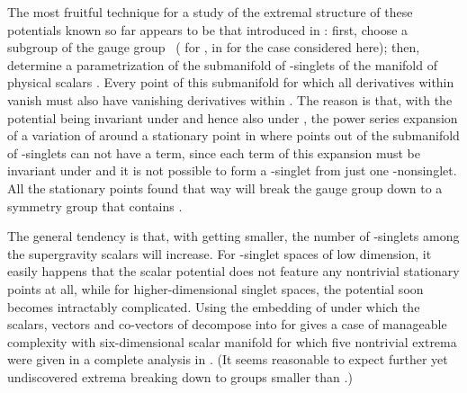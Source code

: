 \documentclass[a4paper,12pt]{article}
\begin{document}
The most fruitful technique for a study of the extremal structure of
these potentials known so far appears to be that introduced in
\cite{Warner:vz}: first, choose a subgroup \coordHE{} of the gauge group~\coordHE{}
(\coordHE{} for \coordHE{}, 
\coordHE{} in for the case considered here); then, determine
a parametrization of the submanifold \coordHE{} of \coordHE{}-singlets of the
manifold of physical scalars \coordHE{}. Every point of this submanifold for
which all derivatives within \coordHE{} vanish must also have vanishing
derivatives within \coordHE{}. The reason is that, with the potential \coordHE{}
being invariant under \coordHE{} and hence also under \coordHE{}, the power series
expansion of a variation \coordHE{} of \coordHE{} around a stationary point
\coordHE{} in \coordHE{} where \coordHE{} points out of the submanifold \coordHE{} of
\coordHE{}-singlets can not have a \coordHE{} term, since each
term of this expansion must be invariant under \coordHE{} and it is not
possible to form a \coordHE{}-singlet from just one \coordHE{}-nonsinglet. All the
stationary points found that way will break the gauge group down to a
symmetry group that contains \coordHE{}.

The general tendency is that, with \coordHE{} getting smaller, the number of
\coordHE{}-singlets among the supergravity scalars will increase. For
\coordHE{}-singlet spaces of low dimension, it easily happens that the scalar
potential does not feature any nontrivial stationary points at all,
while for higher-dimensional singlet spaces, the potential soon
becomes intractably complicated. Using the embedding of \coordHE{} under which the scalars, vectors and co-vectors of \coordHE{}
decompose into \coordHE{} for \coordHE{}
gives a case of manageable complexity with six-dimensional scalar
manifold for which five nontrivial extrema were given in a complete
analysis in
\cite{Warner:vz}. (It seems reasonable to expect further
yet undiscovered extrema breaking \coordHE{} down to groups smaller than
\coordHE{}.)
\end{document}
